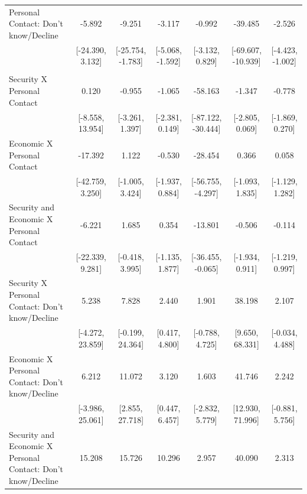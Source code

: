 \documentclass[
  10,
  letterpaper,
  DIV=11,
  numbers=noendperiod]{scrartcl}
\begin{document}
\begin{table}
\begin{tabular}[t]{lcccccc}
\hspace{1em}Personal Contact: Don't know/Decline & -5.892 & -9.251 & -3.117 & -0.992 & -39.485 & -2.526\\
\hspace{1em} & {}[-24.390, 3.132] & {}[-25.754, -1.783] & {}[-5.068, -1.592] & {}[-3.132, 0.829] & {}[-69.607, -10.939] & {}[-4.423, -1.002]\\
\addlinespace[0.3em]
\multicolumn{7}{l}{\cellcolor[HTML]{3498DB}{\textbf{Interactions}}}\\
\hspace{1em}Security X Personal Contact & 0.120 & -0.955 & -1.065 & -58.163 & -1.347 & -0.778\\
\hspace{1em} & {}[-8.558, 13.954] & {}[-3.261, 1.397] & {}[-2.381, 0.149] & {}[-87.122, -30.444] & {}[-2.805, 0.069] & {}[-1.869, 0.270]\\
\hspace{1em}Economic X Personal Contact & -17.392 & 1.122 & -0.530 & -28.454 & 0.366 & 0.058\\
\hspace{1em} & {}[-42.759, 3.250] & {}[-1.005, 3.424] & {}[-1.937, 0.884] & {}[-56.755, -4.297] & {}[-1.093, 1.835] & {}[-1.129, 1.282]\\
\hspace{1em}Security and Economic X Personal Contact & -6.221 & 1.685 & 0.354 & -13.801 & -0.506 & -0.114\\
\hspace{1em} & {}[-22.339, 9.281] & {}[-0.418, 3.995] & {}[-1.135, 1.877] & {}[-36.455, -0.065] & {}[-1.934, 0.911] & {}[-1.219, 0.997]\\
\hspace{1em}Security X Personal Contact: Don't know/Decline & 5.238 & 7.828 & 2.440 & 1.901 & 38.198 & 2.107\\
\hspace{1em} & {}[-4.272, 23.859] & {}[-0.199, 24.364] & {}[0.417, 4.800] & {}[-0.788, 4.725] & {}[9.650, 68.331] & {}[-0.034, 4.488]\\
\hspace{1em}Economic X Personal Contact: Don't know/Decline & 6.212 & 11.072 & 3.120 & 1.603 & 41.746 & 2.242\\
\hspace{1em} & {}[-3.986, 25.061] & {}[2.855, 27.718] & {}[0.447, 6.457] & {}[-2.832, 5.779] & {}[12.930, 71.996] & {}[-0.881, 5.756]\\
\hspace{1em}Security and Economic X Personal Contact: Don't know/Decline & 15.208 & 15.726 & 10.296 & 2.957 & 40.090 & 2.313\\

\end{tabular}
\end{table}
\end{document}
